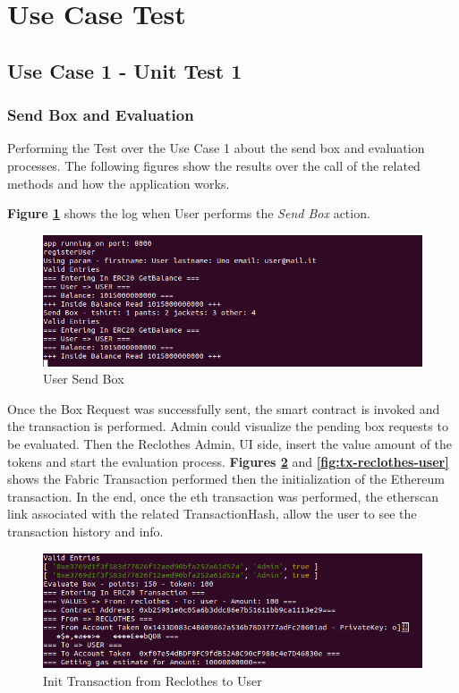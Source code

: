 \section{Use Case Test}

\subsection{Use Case 1 - Unit Test 1}

\subsubsection{Send Box and Evaluation}

Performing the Test over the Use Case 1 about the send box and evaluation processes. The following
figures show the results over the call of the related methods and how the application works. 

\textbf{Figure \ref{fig:user-send-box}} shows the log when User performs the \textit{Send Box} action.

\begin{figure}[h!]
	\centering
    \includegraphics[totalheight=4cm]{img/test/test1/user-send-box.png}
	\caption{User Send Box}
	\label{fig:user-send-box}
\end{figure}

Once the Box Request was successfully sent, the smart contract is invoked and the transaction is 
performed. Admin could visualize the pending box requests to be evaluated. Then the Reclothes Admin, UI side,
insert the value amount of the tokens and start the evaluation process.
\newline
\textbf{Figures \ref{fig:init-tx-reclothes-user}} and \textbf{\ref{fig:tx-reclothes-user}} 
shows the Fabric Transaction performed then the initialization of the Ethereum transaction. In the end, once 
the eth transaction was performed, the etherscan link associated with the related TransactionHash, allow the 
user to see the transaction history and info.

\begin{figure}[h!]
	\centering
    \includegraphics[totalheight=4cm]{img/test/test1/init-tx-RU.png}
	\caption{Init Transaction from Reclothes to User}
	\label{fig:init-tx-reclothes-user}
\end{figure}

